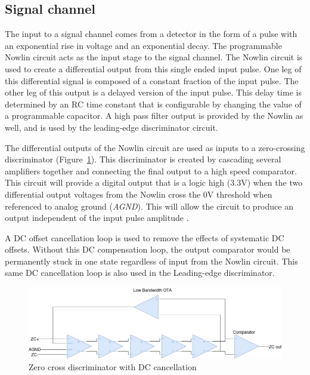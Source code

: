 \documentclass[12pt,oneside,final]{siuethesis}
\theoremstyle{definition}
\begin{document}
\subsection{Signal channel}
\par The input to a signal channel comes from a detector in the form of a pulse with an exponential rise in voltage and an exponential decay. The programmable Nowlin circuit acts as the input stage to the signal channel. The Nowlin circuit is used to create a differential output from this single ended input pulse. One leg of this differential signal is composed of a constant fraction of the input pulse. The other leg of this output is a delayed version of the input pulse. This delay time is determined by an RC time constant that is configurable by changing the value of a programmable capacitor. A high pass filter output is provided by the Nowlin as well, and is used by the leading-edge discriminator circuit.
\par The differential outputs of the Nowlin circuit are used as inputs to a zero-crossing discriminator (Figure~\ref{fig:zcd}). This discriminator is created by cascading several amplifiers together and connecting the final output to a high speed comparator. This circuit will provide a digital output that is a logic high (3.3V) when the two differential output voltages from the Nowlin cross the 0V threshold when referenced to analog ground (\emph{AGND}). This will allow the circuit to produce an output independent of the input pulse amplitude \cite{CFD}. 
\par A DC offset cancellation loop is used to remove the effects of systematic DC offsets. Without this DC compensation loop, the output comparator would be permanently stuck in one state regardless of input from the Nowlin circuit. This same DC cancellation loop is also used in the Leading-edge discriminator.

\begin{figure}[htbp!]
\centering
\includegraphics[scale=.45,keepaspectratio=true]{./ch2_figures/zcd.png} 
\caption{Zero cross discriminator with DC cancellation}
\label{fig:zcd}
\end{figure}
\end{document}
